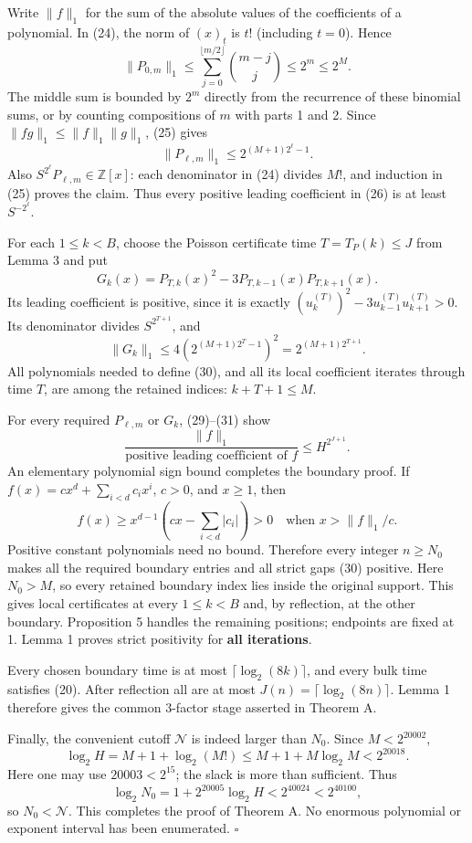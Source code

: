 \documentclass[11pt,a4paper]{article}
\begin{document}
Write \(\|f\|_1\) for the sum of the absolute values of the coefficients
of a polynomial. In (24), the norm of \((x)_{\underline t}\) is \(t!\)
(including \(t=0\)). Hence \[
 \|P_{0,m}\|_1\leq
 \sum_{j=0}^{\lfloor m/2\rfloor}\binom{m-j}{j}\leq2^m\leq2^M. \tag{28}
\] The middle sum is bounded by \(2^m\) directly from the recurrence of
these binomial sums, or by counting compositions of \(m\) with parts 1
and 2. Since \(\|fg\|_1\leq\|f\|_1\|g\|_1\), (25) gives \[
 \|P_{\ell,m}\|_1\leq
 2^{(M+1)2^\ell-1}. \tag{29}
\] Also \(S^{2^\ell}P_{\ell,m}\in\mathbb Z[x]\): each denominator in
(24) divides \(M!\), and induction in (25) proves the claim. Thus every
positive leading coefficient in (26) is at least \(S^{-2^\ell}\).

For each \(1\leq k<B\), choose the Poisson certificate time
\(T=T_P(k)\leq J\) from Lemma 3 and put \[
 G_k(x)=P_{T,k}(x)^2-3P_{T,k-1}(x)P_{T,k+1}(x). \tag{30}
\] Its leading coefficient is positive, since it is exactly
\((u_k^{(T)})^2-3u_{k-1}^{(T)}u_{k+1}^{(T)}>0\). Its denominator divides
\(S^{2^{T+1}}\), and \[
 \|G_k\|_1\leq4\left(2^{(M+1)2^T-1}\right)^2
 =2^{(M+1)2^{T+1}}. \tag{31}
\] All polynomials needed to define (30), and all its local coefficient
iterates through time \(T\), are among the retained indices:
\(k+T+1\leq M\).

For every required \(P_{\ell,m}\) or \(G_k\), (29)--(31) show \[
 \frac{\|f\|_1}{\text{positive leading coefficient of }f}
 \leq H^{2^{J+1}}. \tag{32}
\] An elementary polynomial sign bound completes the boundary proof. If
\(f(x)=cx^d+\sum_{i<d}c_ix^i\), \(c>0\), and \(x\geq1\), then \[
 f(x)\geq x^{d-1}\left(cx-\sum_{i<d}|c_i|\right)>0
 \quad\text{when }x>\|f\|_1/c.
\] Positive constant polynomials need no bound. Therefore every integer
\(n\geq N_0\) makes all the required boundary entries and all strict
gaps (30) positive. Here \(N_0>M\), so every retained boundary index
lies inside the original support. This gives local certificates at every
\(1\leq k<B\) and, by reflection, at the other boundary. Proposition 5
handles the remaining positions; endpoints are fixed at 1. Lemma 1
proves strict positivity for \textbf{all iterations}.

Every chosen boundary time is at most \(\lceil\log_2(8k)\rceil\), and
every bulk time satisfies (20). After reflection all are at most
\(J(n)=\lceil\log_2(8n)\rceil\). Lemma 1 therefore gives the common
3-factor stage asserted in Theorem A.

Finally, the convenient cutoff \(\mathcal N\) is indeed larger than
\(N_0\). Since \(M<2^{20002}\), \[
 \log_2 H=M+1+\log_2(M!)
 \leq M+1+M\log_2M<2^{20018}.
\] Here one may use \(20003<2^{15}\); the slack is more than sufficient.
Thus \[
 \log_2N_0=1+2^{20005}\log_2H<2^{40024}<2^{40100},
\] so \(N_0<\mathcal N\). This completes the proof of Theorem A. No
enormous polynomial or exponent interval has been enumerated.
\(\square\)
\end{document}
